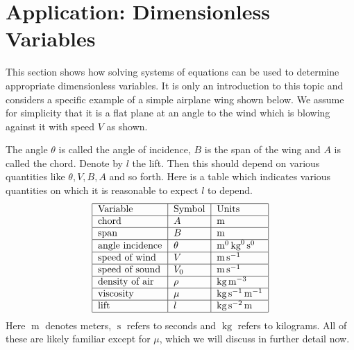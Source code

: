 \section{Application: Dimensionless Variables}

\begingroup  %

\newcommand\m{\mathop{\textrm{m}}\nolimits}
\newcommand\kg{\mathop{\textrm{kg}}\nolimits}
\newcommand\s{\mathop{\textrm{s}}\nolimits}

This section shows how solving systems of equations can be used to
determine appropriate dimensionless variables. It is only an
introduction to this topic and considers a specific example of a
simple airplane wing shown below. We assume for simplicity that it is a flat plane at an angle to the wind which is blowing against it
with speed $V$ as shown.

\begin{center}
\end{center}

The angle $\theta$ is called the angle of incidence, $B$ is the span of the wing and $A$ is called the chord. Denote by $l$ the lift. Then this should depend on
various quantities like $\theta ,V,B,A$ and so forth. Here is a table which
indicates various quantities on which it is reasonable to expect $l$ to
depend. 
\begin{equation*}
\begin{tabular}{|l|l|l|}
\hline
Variable & Symbol & Units \\ \hline
chord & $A$ & $\m$ \\ \hline
span & $B$ & $\m$ \\ \hline
angle incidence & $\theta $ & $\m^{0}\kg^{0}\s ^{0}$ \\ \hline
speed of wind & $V$ & $\m\s ^{-1}$ \\ \hline
speed of sound & $V_{0}$ & $\m\s ^{-1}$ \\ \hline
density of air & $\rho $ & $\kg\m^{-3}$ \\ \hline
viscosity & $\mu $ & $\kg\s ^{-1}\m^{-1}$ \\ \hline
lift & $l$ & $\kg\s ^{-2}\m$ \\ \hline
\end{tabular}
\end{equation*}
Here $\m$ denotes meters, $\s $ refers to seconds and $\kg$ refers to
kilograms. All of these are likely familiar except for $\mu $, which we will discuss in further detail now. 


